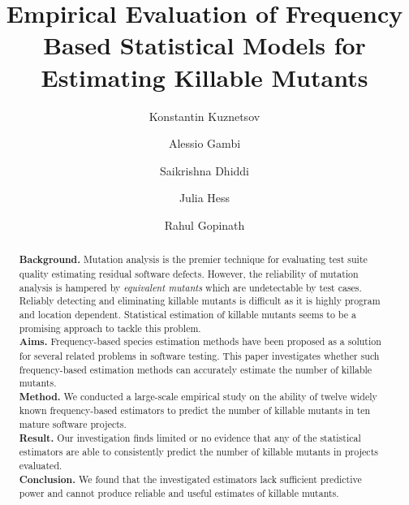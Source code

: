 \documentclass[sigconf]{acmart}
\newcommand{\mytitle}{Empirical Evaluation of Frequency Based Statistical Models for Estimating Killable Mutants}
\newcommand{\estimatorCount}{twelve\xspace}
\newcommand{\projectCount}{ten\xspace}
\begin{document}
\title{\mytitle}



\author{Konstantin Kuznetsov}

\author{Alessio Gambi}

\author{Saikrishna Dhiddi}

\author{Julia Hess}

\author{Rahul Gopinath}





\begin{abstract}
\textbf{Background.}
Mutation analysis is the premier technique for evaluating test suite
quality estimating residual software defects. However, the reliability of 
mutation analysis is hampered by \emph{equivalent mutants} which
are undetectable by test cases.
Reliably detecting and eliminating killable mutants is difficult
as it is highly program and location dependent. Statistical estimation of
killable mutants seems to be a promising approach to tackle this problem.\\
\textbf{Aims.}
Frequency-based species estimation methods
have been proposed as a solution for several related problems in software
testing.
This paper investigates whether such frequency-based estimation methods
can accurately estimate the number of killable mutants.\\
\textbf{Method.}
We conducted a large-scale empirical study
on the ability of \estimatorCount widely known frequency-based
estimators to predict the number of killable mutants in
\projectCount mature software projects.\\
\textbf{Result.}
Our investigation finds limited or no evidence that any of the statistical
estimators are able to consistently predict the number of killable mutants in
projects evaluated.\\
\textbf{Conclusion.}
We found that the investigated estimators lack sufficient
predictive power and cannot produce reliable and useful estimates of killable
mutants. 
\end{abstract}
\end{document}
